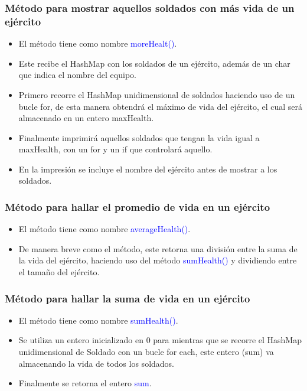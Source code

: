 \documentclass{article}
\begin{document}
\subsubsection{Método para mostrar aquellos soldados con más vida de un ejército}
\begin{itemize}
    \item El método tiene como nombre \textcolor{blue}{moreHealt()}.
    \item Este recibe el HashMap con los soldados de un ejército, además de un char que indica el nombre del equipo.
    \item Primero recorre el HashMap unidimensional de soldados haciendo uso de un bucle for, de esta manera obtendrá el máximo de vida del ejército, el cual será almacenado en un entero maxHealth.
    \item Finalmente imprimirá aquellos soldados que tengan la vida igual a maxHealth, con un for y un if que controlará aquello.
    \item En la impresión se incluye el nombre del ejército antes de mostrar a los soldados.
\end{itemize}



\subsubsection{Método para hallar el promedio de vida en un ejército}
\begin{itemize}
    \item El método tiene como nombre \textcolor{blue}{averageHealth()}.
    \item De manera breve como el método, este retorna una división entre la suma de la vida del ejército, haciendo uso del método \textcolor{blue}{sumHealth()} y dividiendo entre el tamaño del ejército.
\end{itemize}



\subsubsection{Método para hallar la suma de vida en un ejército}
\begin{itemize}
    \item El método tiene como nombre \textcolor{blue}{sumHealth()}.
    \item Se utiliza un entero inicializado en 0 para mientras que se recorre el HashMap unidimensional de Soldado con un bucle for each, este entero (sum) va almacenando la vida de todos los soldados.
    \item Finalmente se retorna el entero \textcolor{blue}{sum}.
\end{itemize}

\end{document}
